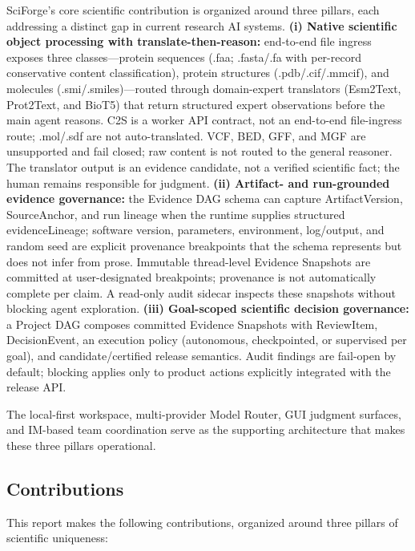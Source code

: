 \documentclass[sn-basic,Numbered,pdflatex]{sn-jnl}
\begin{document}
SciForge's core scientific contribution is organized around three pillars, each addressing a distinct gap in current research AI systems. \textbf{(i) Native scientific object processing with translate-then-reason:} end-to-end file ingress exposes three classes---protein sequences (.faa; .fasta/.fa with per-record conservative content classification), protein structures (.pdb/.cif/.mmcif), and molecules (.smi/.smiles)---routed through domain-expert translators (Esm2Text, Prot2Text, and BioT5) that return structured expert observations before the main agent reasons. C2S is a worker API contract, not an end-to-end file-ingress route; .mol/.sdf are not auto-translated. VCF, BED, GFF, and MGF are unsupported and fail closed; raw content is not routed to the general reasoner. The translator output is an evidence candidate, not a verified scientific fact; the human remains responsible for judgment. \textbf{(ii) Artifact- and run-grounded evidence governance:} the Evidence DAG schema can capture ArtifactVersion, SourceAnchor, and run lineage when the runtime supplies structured evidenceLineage; software version, parameters, environment, log/output, and random seed are explicit provenance breakpoints that the schema represents but does not infer from prose. Immutable thread-level Evidence Snapshots are committed at user-designated breakpoints; provenance is not automatically complete per claim. A read-only audit sidecar inspects these snapshots without blocking agent exploration. \textbf{(iii) Goal-scoped scientific decision governance:} a Project DAG composes committed Evidence Snapshots with ReviewItem, DecisionEvent, an execution policy (autonomous, checkpointed, or supervised per goal), and candidate/certified release semantics. Audit findings are fail-open by default; blocking applies only to product actions explicitly integrated with the release API.

The local-first workspace, multi-provider Model Router, GUI judgment surfaces, and IM-based team coordination serve as the supporting architecture that makes these three pillars operational.

\subsection{Contributions}

This report makes the following contributions, organized around three pillars of scientific uniqueness:
\end{document}
